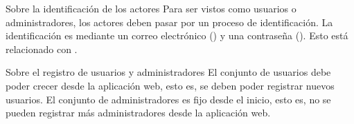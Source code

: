 {Sobre la identificación de los actores}
{
  Para ser vistos como usuarios o administradores, los actores deben
  pasar por un proceso de identificación. La identificación es mediante
  un correo electrónico () y una
  contraseña (). Esto está relacionado
  con .
}

{Sobre el registro de usuarios y administradores}
{
  El conjunto de usuarios debe poder crecer desde la aplicación web, esto es,
  se deben poder registrar nuevos usuarios. El conjunto de administradores es
  fijo desde el inicio, esto es, no se pueden registrar más administradores
  desde la aplicación web.
}
